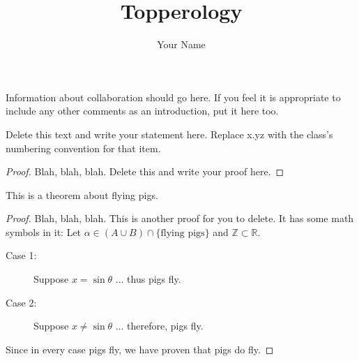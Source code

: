 \documentclass[12pt]{article}
\newenvironment{theorem}[2][Theorem]{\begin{trivlist}
\item[\hskip \labelsep {\bfseries #1}\hskip \labelsep {\bfseries #2.}]}{\end{trivlist}}
\newenvironment{problem}[2][Problem]{\begin{trivlist}
\item[\hskip \labelsep {\bfseries #1}\hskip \labelsep {\bfseries #2.}]}{\end{trivlist}}
\begin{document}
 
 
\title{Topperology} 
\author{Your Name} %
\maketitle

Information about collaboration should go here.  If you feel it is appropriate to include any other comments as an introduction, put it here too.

\begin{problem}{x.yz} %
Delete this text and write your statement here. Replace x.yz with the class's numbering convention for that item.
\end{problem}
 
\begin{proof}  
Blah, blah, blah. Delete this and write your proof here.
\end{proof}
 
\begin{theorem}{w.xy}
This is a theorem about flying pigs.
\end{theorem}
 
\begin{proof}
Blah, blah, blah.  This is another proof for you to delete. It has some math symbols in it:  Let $\alpha \in (A \cup B) \cap \{\text{flying pigs}\}$ and $\mathbb{Z} \subset \mathbb{R}$.  





\begin{description}
\item[Case 1:] Suppose $x=\sin\theta$ ... thus pigs fly.
\item[Case 2:] Suppose $x \neq \sin\theta$ ... therefore, pigs fly.
\end{description}
Since in every case pigs fly, we have proven that pigs do fly.

\end{proof}
 
\end{document}

